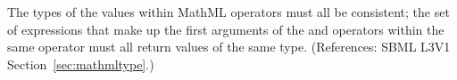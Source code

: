 The types of the values within MathML  operators must all
be consistent; \ie the set of expressions that make up the first
arguments of the  and  operators within the
same  operator must all return values of the same type.
(References: SBML L3V1 Section~\ref{sec:mathmltype}.)
